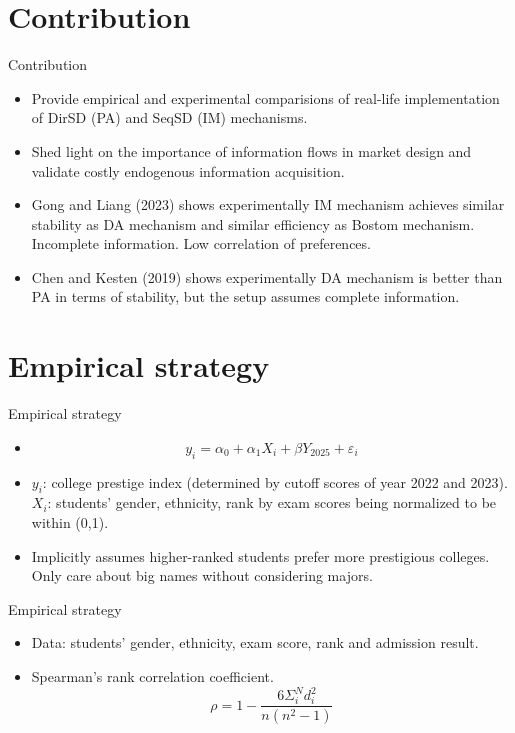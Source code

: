 \documentclass[dvipsnames,mathserif]{beamer}
\begin{document}
{\section{Contribution}
\begin{frame}{Contribution}
\large
    \begin{itemize}
        \item Provide empirical and experimental comparisions of real-life implementation of DirSD (PA) and SeqSD (IM) mechanisms.
        \vspace{0.2cm}
        \item Shed light on the importance of information flows in market design and validate costly endogenous information acquisition.
        \vspace{0.2cm}
        \item Gong and Liang (2023) shows experimentally IM mechanism achieves similar stability as DA mechanism and similar efficiency as Bostom mechanism. Incomplete information. Low correlation of preferences.
        \vspace{0.2cm}
        \item Chen and Kesten (2019) shows experimentally DA mechanism is better than PA in terms of stability, but the setup assumes complete information.   
    \end{itemize}
\end{frame}


\section{Empirical strategy}
\begin{frame}{Empirical strategy}
\large
    \begin{itemize}
        \item \[y_i = \alpha_0 + \alpha_1 X_i + \beta Y_{2025} + \varepsilon_i\]
        \item $y_i$: college prestige index (determined by cutoff scores of year 2022 and 2023).\\
        $X_i$: students' gender, ethnicity, rank by exam scores being normalized to be within (0,1).\\
        \item Implicitly assumes higher-ranked students prefer more prestigious colleges. Only care about big names without considering majors. \\
    \end{itemize}
\end{frame}
\begin{frame}{Empirical strategy}
\large
	\begin{itemize}
		\item Data: students' gender, ethnicity, exam score, rank and admission result.
        \item Spearman's rank correlation coefficient.
        \[\rho = 1 -  \frac{6\Sigma_{i}^{N}d_i^2}{n(n^2-1)}\]
        

\end{itemize}
\end{frame}}
\end{document}
